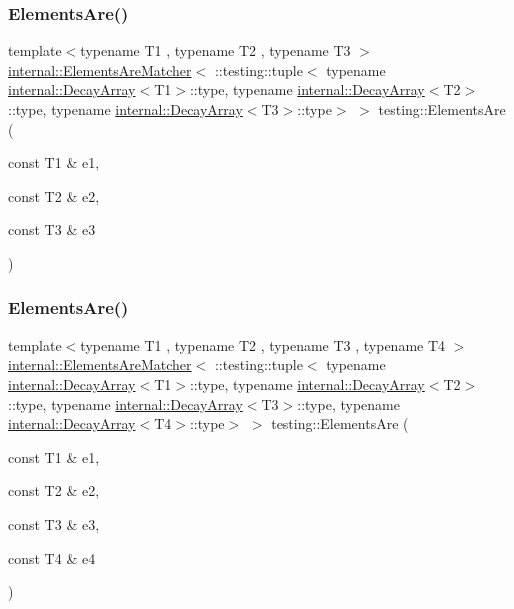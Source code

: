 \mbox{\label{namespacetesting_a0be8a0ad5d7461fd1da13ecac4e21e2a}} 
\subsubsection{\texorpdfstring{Elements\+Are()}{ElementsAre()}\hspace{0.1cm}{\footnotesize\ttfamily [4/11]}}
{\footnotesize\ttfamily template$<$typename T1 , typename T2 , typename T3 $>$ \\
\hyperlink{classtesting_1_1internal_1_1_elements_are_matcher}{internal\+::\+Elements\+Are\+Matcher}$<$ \+::testing\+::tuple$<$ typename \hyperlink{structtesting_1_1internal_1_1_decay_array}{internal\+::\+Decay\+Array}$<$T1$>$\+::type, typename \hyperlink{structtesting_1_1internal_1_1_decay_array}{internal\+::\+Decay\+Array}$<$T2$>$\+::type, typename \hyperlink{structtesting_1_1internal_1_1_decay_array}{internal\+::\+Decay\+Array}$<$T3$>$\+::type$>$ $>$ testing\+::\+Elements\+Are (\begin{DoxyParamCaption}\item[{const T1 \&}]{e1,  }\item[{const T2 \&}]{e2,  }\item[{const T3 \&}]{e3 }\end{DoxyParamCaption})\hspace{0.3cm}{\ttfamily [inline]}}

\mbox{\label{namespacetesting_a4109ce480e0145bfce7c46120afb36d3}} 
\subsubsection{\texorpdfstring{Elements\+Are()}{ElementsAre()}\hspace{0.1cm}{\footnotesize\ttfamily [5/11]}}
{\footnotesize\ttfamily template$<$typename T1 , typename T2 , typename T3 , typename T4 $>$ \\
\hyperlink{classtesting_1_1internal_1_1_elements_are_matcher}{internal\+::\+Elements\+Are\+Matcher}$<$ \+::testing\+::tuple$<$ typename \hyperlink{structtesting_1_1internal_1_1_decay_array}{internal\+::\+Decay\+Array}$<$T1$>$\+::type, typename \hyperlink{structtesting_1_1internal_1_1_decay_array}{internal\+::\+Decay\+Array}$<$T2$>$\+::type, typename \hyperlink{structtesting_1_1internal_1_1_decay_array}{internal\+::\+Decay\+Array}$<$T3$>$\+::type, typename \hyperlink{structtesting_1_1internal_1_1_decay_array}{internal\+::\+Decay\+Array}$<$T4$>$\+::type$>$ $>$ testing\+::\+Elements\+Are (\begin{DoxyParamCaption}\item[{const T1 \&}]{e1,  }\item[{const T2 \&}]{e2,  }\item[{const T3 \&}]{e3,  }\item[{const T4 \&}]{e4 }\end{DoxyParamCaption})\hspace{0.3cm}{\ttfamily [inline]}}

